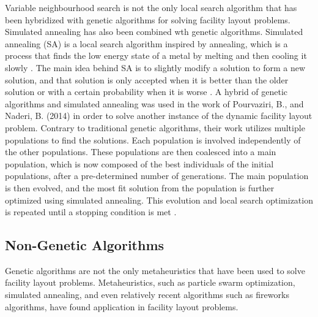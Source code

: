 Variable neighbourhood search is not the only local search algorithm that has been hybridized with genetic algorithms for solving facility layout problems. Simulated annealing has also been combined wth genetic algorithms. Simulated annealing (SA) is a local search algorithm inspired by annealing, which is a process that finds the low energy state of a metal by melting and then cooling it slowly \cite{Lai1997}. The main idea behind SA is to slightly modify a solution to form a new solution, and that solution is only accepted when it is better than the older solution or with a certain probability when it is worse \cite{Dueck1993}. A hybrid of genetic algorithms and simulated annealing was used in the work of Pourvaziri, B., and Naderi, B. (2014) in order to solve another instance of the dynamic facility layout problem. Contrary to traditional genetic algorithms, their work utilizes multiple populations to find the solutions. Each population is involved independently of the other populations. These populations are then coalesced into a main population, which is now composed of the best individuals of the initial populations, after a pre-determined number of generations. The main population is then evolved, and the most fit solution from the population is further optimized using simulated annealing. This evolution and local search optimization is repeated until a stopping condition is met \cite{Pourvaziri2014}. 

\subsection{Non-Genetic Algorithms}
Genetic algorithms are not the only metaheuristics that have been used to solve facility layout problems. Metaheuristics, such as particle swarm optimization, simulated annealing, and even relatively recent algorithms such as fireworks algorithms, have found application in facility layout problems.

